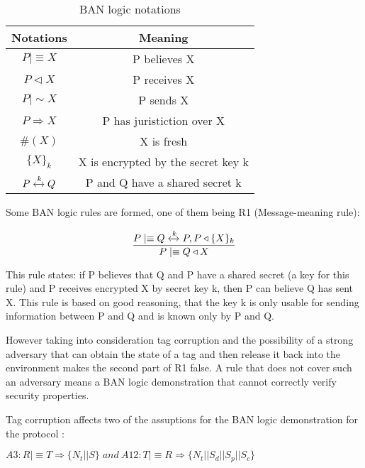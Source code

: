     \newcommand{\believes}{\mid\equiv}
    \newcommand{\receives}{\triangleleft}
    \newcommand{\sends}{\mid\sim}
    \newcommand{\controls}{\Rightarrow}
    \newcommand{\fresh}[1]{\#(#1)}
    \newcommand{\encrypt}[2]{\{#1\}_{#2}}
    \newcommand{\sharesecret}[1]{\xleftrightarrow{#1}}

    \begin{table}[H]
    \centering
    \caption{BAN logic notations}
    \begin{tabular}{| c | c |}
        \hline
        Notations & Meaning \\
        \hline
        $P \believes X$ & P believes X \\
        $P \receives X$ & P receives X \\
        $P \sends X$ & P sends X \\
        $P \controls X$ & P has juristiction over X \\
        $ \fresh{X} $ & X is fresh \\
        $ \encrypt{X}{k} $ & X is encrypted by the secret key k \\
        $ P \sharesecret{k} Q $ & P and Q have a shared secret k \\
        \hline
    \end{tabular}
    \end{table}

    Some BAN logic rules are formed, one of them being R1 (Message-meaning rule): 
    
    \[
    \frac{P \believes Q \sharesecret{k} P, P \receives \encrypt{X}{k}}{P \believes Q \receives X}
    \]
    
    This rule states: if P believes that Q and P have a shared secret (a key for this rule) and P receives encrypted X by secret key k, then
    P can believe Q has sent X. This rule is based on good reasoning, that the key k is only usable for sending information between P and Q 
    and is known only by P and Q.

    However taking into consideration tag corruption and the possibility of a strong adversary that can obtain the state of a tag and then
    release it back into the environment makes the second part of R1 false. A rule that does not cover such an adversary means a BAN
    logic demonstration that cannot correctly verify security properties.
    
    Tag corruption affects two of the assuptions for the BAN logic demonstration for the protocol \cite{BOM}:

    \begin{center}
        $ A3: R \believes T \controls \encrypt{N_t||S}{}\ and\ A12: T \believes R \controls \{N_t||S_d||S_p||S_c\} $
    \end{center}

